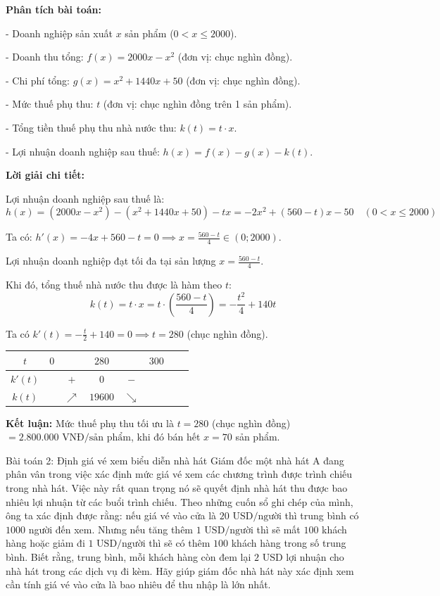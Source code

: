 \documentclass[12pt,a4paper]{article}
\begin{document}
\noindent\textbf{Phân tích bài toán:}

- Doanh nghiệp sản xuất $x$ sản phẩm ($0 < x \le 2000$). 

- Doanh thu tổng: $f(x) = 2000x - x^2$ (đơn vị: chục nghìn đồng).

- Chi phí tổng: $g(x) = x^2 + 1440x + 50$ (đơn vị: chục nghìn đồng).

- Mức thuế phụ thu: $t$ (đơn vị: chục nghìn đồng trên 1 sản phẩm).

- Tổng tiền thuế phụ thu nhà nước thu: $k(t) = t \cdot x$.

- Lợi nhuận doanh nghiệp sau thuế: $h(x) = f(x) - g(x) - k(t)$.

\noindent\textbf{Lời giải chi tiết:}

Lợi nhuận doanh nghiệp sau thuế là:
\[ h(x) = (2000x - x^2) - (x^2 + 1440x + 50) - tx = -2x^2 + (560 - t)x - 50 \quad (0 < x \le 2000) \]

Ta có: $h'(x) = -4x + 560 - t = 0 \implies x = \frac{560 - t}{4} \in (0; 2000)$.

Lợi nhuận doanh nghiệp đạt tối đa tại sản lượng $x = \frac{560 - t}{4}$. 

Khi đó, tổng thuế nhà nước thu được là hàm theo $t$:
\[ k(t) = t \cdot x = t \cdot \left(\frac{560 - t}{4}\right) = -\frac{t^2}{4} + 140t \]

Ta có $k'(t) = -\frac{t}{2} + 140 = 0 \implies t = 280$ (chục nghìn đồng).

\begin{center}
\begin{tabular}{c|lcccccr}
$t$ & $0$ & & $280$ & & $300$ \\ 
\hline
$k'(t)$ & & $+$ & $0$ & $-$ & \\ 
\hline
$k(t)$ & & $\nearrow$ & $19600$ & $\searrow$ & \\ 
\end{tabular}
\end{center}

\noindent\textbf{Kết luận:} Mức thuế phụ thu tối ưu là $t = 280$ (chục nghìn đồng) $= 2.800.000\text{ VNĐ/sản phẩm}$, khi đó bán hết $x = 70$ sản phẩm.

\vspace{0.5cm}

\begin{problembox}{Bài toán 2: Định giá vé xem biểu diễn nhà hát}
Giám đốc một nhà hát A đang phân vân trong việc xác định mức giá vé xem các chương trình được trình chiếu trong nhà hát. Việc này rất quan trọng nó sẽ quyết định nhà hát thu được bao nhiêu lợi nhuận từ các buổi trình chiếu. Theo những cuốn sổ ghi chép của mình, ông ta xác định được rằng: nếu giá vé vào cửa là $20 \text{ USD/người}$ thì trung bình có $1000$ người đến xem. Nhưng nếu tăng thêm $1 \text{ USD/người}$ thì sẽ mất $100$ khách hàng hoặc giảm đi $1 \text{ USD/người}$ thì sẽ có thêm $100$ khách hàng trong số trung bình. Biết rằng, trung bình, mỗi khách hàng còn đem lại $2 \text{ USD}$ lợi nhuận cho nhà hát trong các dịch vụ đi kèm. Hãy giúp giám đốc nhà hát này xác định xem cần tính giá vé vào cửa là bao nhiêu để thu nhập là lớn nhất.
\end{problembox}
\end{document}
